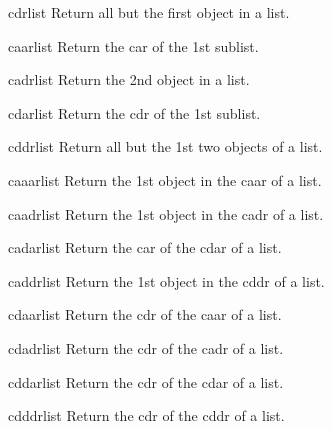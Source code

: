 \documentclass[10pt,english]{book}
\begin{document}
\begin{accessor}{cdr}{list}
  Return all but the first object in a list.
\end{accessor}

\begin{accessor}{caar}{list}
  Return the car of the 1st sublist.
\end{accessor}

\begin{accessor}{cadr}{list}
  Return the 2nd object in a list.
\end{accessor}

\begin{accessor}{cdar}{list}
  Return the cdr of the 1st sublist.
\end{accessor}

\begin{accessor}{cddr}{list}
  Return all but the 1st two objects of a list.
\end{accessor}

\begin{accessor}{caaar}{list}
  Return the 1st object in the caar of a list.
\end{accessor}

\begin{accessor}{caadr}{list}
  Return the 1st object in the cadr of a list.
\end{accessor}

\begin{accessor}{cadar}{list}
  Return the car of the cdar of a list.
\end{accessor}

\begin{accessor}{caddr}{list}
  Return the 1st object in the cddr of a list.
\end{accessor}

\begin{accessor}{cdaar}{list}
  Return the cdr of the caar of a list.
\end{accessor}

\begin{accessor}{cdadr}{list}
  Return the cdr of the cadr of a list.
\end{accessor}

\begin{accessor}{cddar}{list}
  Return the cdr of the cdar of a list.
\end{accessor}

\begin{accessor}{cdddr}{list}
  Return the cdr of the cddr of a list.
\end{accessor}
\end{document}

